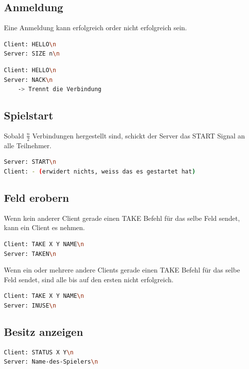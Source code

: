 \subsection{Anmeldung}
Eine Anmeldung kann erfolgreich order nicht erfolgreich sein.
\begin{lstlisting}[language=bash,numbers=none,caption={Erfolgreiche Anmeldung}]
Client: HELLO\n
Server: SIZE n\n	
\end{lstlisting}

\begin{lstlisting}[language=bash,numbers=none,caption={Nicht erfolgreiche Anmeldung}]
Client: HELLO\n
Server: NACK\n
    -> Trennt die Verbindung
\end{lstlisting}

\subsection{Spielstart}
\label{spielstart}
Sobald $\frac{n}{2}$ Verbindungen hergestellt sind, schickt der Server das START Signal an alle Teilnehmer.
\begin{lstlisting}[language=bash,numbers=none,caption={Spielstart}]
Server: START\n
Client: - (erwidert nichts, weiss das es gestartet hat)
\end{lstlisting}

\subsection{Feld erobern}
Wenn kein anderer Client gerade einen TAKE Befehl für das selbe Feld sendet, kann ein Client es nehmen.
\begin{lstlisting}[language=bash,numbers=none,caption={Erfolgreiche Eroberung}]
Client: TAKE X Y NAME\n
Server: TAKEN\n
\end{lstlisting}

Wenn ein oder mehrere andere Clients gerade einen TAKE Befehl für das selbe Feld sendet, sind alle bis auf den ersten nicht erfolgreich.

\begin{lstlisting}[language=bash,numbers=none,caption={Nichterfolgreiche Eroberung}]
Client: TAKE X Y NAME\n
Server: INUSE\n
\end{lstlisting}

\subsection{Besitz anzeigen}
\begin{lstlisting}[language=bash,numbers=none,caption={Besitz anzeigen}]
Client: STATUS X Y\n
Server: Name-des-Spielers\n
\end{lstlisting}

